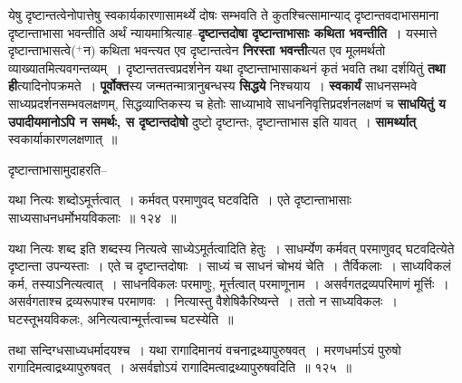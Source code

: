 \documentclass[article,12pt,a4paper]{memoir}
\newcommand{\add}[1]{($^{+}$#1)}
\begin{document}
	  \pstart येषु दृष्टान्तत्वेनोपात्तेषु स्वकार्यकारणासामर्थ्ये दोषः सम्भवति ते कुतश्चित्सामान्याद् दृष्टान्तवदाभासमाना दृष्टान्ताभासा भवन्तीति अर्थं न्यायमाश्रित्याह--\textbf{दृष्टान्तदोषा दृष्टान्ताभासाः कथिता भवन्तीति} । यस्मात्ते दृष्टान्ताभासत्वे\add{न} कथिता भवन्त्यत एव दृष्टान्तत्वेन \textbf{निरस्ता भवन्ती}त्यत एव मूलमर्थतो व्याख्यातमित्यवगन्तव्यम् । दृष्टान्ततत्त्वप्रदर्शनेन यथा दृष्टान्ताभासाकथनं कृतं भवति तथा दर्शयितुं \textbf{तथा ही}त्यादिनोपक्रमते । \textbf{पूर्वोक्त}स्य जन्मतन्मात्रानुबन्धस्य \textbf{सिद्धये} निश्चयाय । \textbf{स्वकार्यं} साधनसम्भवे साध्यप्रदर्शनसम्भवलक्षणम्, सिद्धव्याप्तिकस्य च हेतोः साध्याभावे साधननिवृत्तिप्रदर्शनलक्षणं च \textbf{साधयितुं य उपादीयमानोऽपि न समर्थः, स दृष्टान्तदोषो} दुष्टो दृष्टान्तः, दृष्टान्ताभास इति यावत् । \textbf{सामर्थ्यात्} स्वकार्याकारणलक्षणात् ॥
	\pend
	  \bigskip
	  \begingroup
	

	  \pstart दृष्टान्ताभासामुदाहरति--
	\pend
        
	  \bigskip
	  \begingroup
	

	  \pstart यथा नित्यः शब्दोऽमूर्त्तत्वात् । कर्मवत् परमाणुवद् घटवदिति । एते दृष्टान्ताभासाः साध्यसाधनधर्मोभयविकलाः ॥ १२४ ॥
	\pend
      
	  \endgroup
	 

	  \pstart यथा नित्यः शब्द इति शब्दस्य नित्यत्वे साध्येऽमूर्तत्वादिति हेतुः । साधर्म्येण कर्मवत् परमाणुवद् घटवदित्येते दृष्टान्ता उपन्यस्ताः । एते च दृष्टान्तदोषाः । साध्यं च साधनं चोभयं चेति । तैर्विकलाः । साध्यविकलं कर्म, तस्याऽनित्यत्वात् । साधनविकलः परमाणुः, मूर्त्तत्वात् परमाणूनाम । असर्वगतद्रव्यपरिमाणं मूर्त्तिः । असर्वगताश्च द्रव्यरूपाश्च परमाणवः । नित्यास्तु वैशेषिकैरिष्यन्ते । ततो न साध्यविकलः । घटस्तूभयविकलः, अनित्यत्वान्मूर्त्तत्वाच्च घटस्येति ॥
	\pend
        
	  \bigskip
	  \begingroup
	

	  \pstart तथा सन्दिग्धसाध्यधर्मादयश्च । यथा रागादिमानयं वचनाद्रथ्यापुरुषवत् । मरणधर्माऽयं पुरुषो रागादिमत्वाद्रथ्यापुरुषवत् । असर्वज्ञोऽयं रागादिमत्वाद्रथ्यापुरुषवदिति ॥ १२५ ॥
	\pend
      
\end{document}
